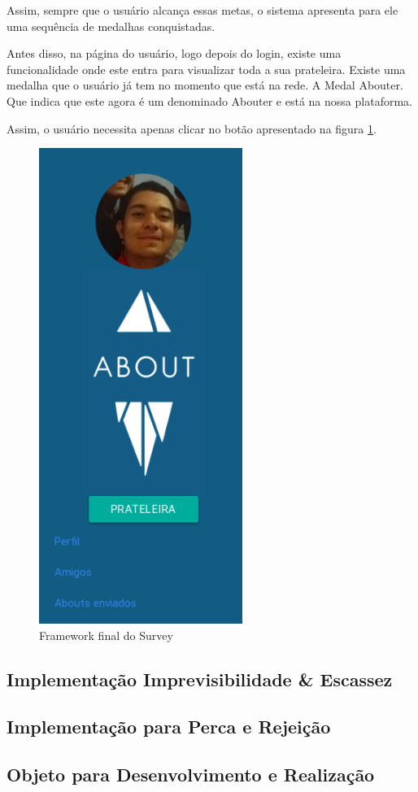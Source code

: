 Assim, sempre que o usuário alcança essas metas, o sistema apresenta para ele uma sequência de medalhas
conquistadas.

Antes disso, na página do usuário, logo depois do login, existe uma funcionalidade onde este entra para visualizar toda a sua prateleira.
Existe uma medalha que o usuário já tem no momento que está na rede. A Medal Abouter. Que indica que este
agora é um denominado Abouter e está na nossa plataforma.

Assim, o usuário necessita apenas clicar no botão apresentado na figura \ref{fig:about_trofeus}.

\begin{figure}[h]
    \centering

    \includegraphics[width=250px, scale=1]{figuras/about_trofeus}
    \caption{Framework final do Survey}

    \label{fig:about_trofeus}
\end{figure}

\subsection{Implementação Imprevisibilidade \& Escassez}
\label{sub:implementacao_imprevisibilidade}

\subsection{Implementação para Perca e Rejeição}
\label{sub:implementacao_perca_rejeicao}

\subsection{Objeto para Desenvolvimento e Realização}
\label{sub:objeto_desenvolvimento_e_realizacao}
